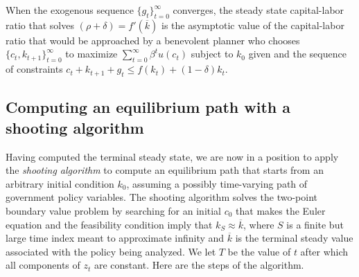 When the exogenous sequence  $\{g_t\}_{t=0}^\infty$  converges, the steady state capital-labor ratio that solves $(\rho+\delta)=f'(\overline k)$ is  the
asymptotic value of the capital-labor  ratio that would be approached by
a benevolent planner who chooses $\{c_t, k_{t+1}\}_{t=0}^\infty$ to maximize $\sum_{t=0}^\infty \beta^t u(c_t) $
subject to $k_0$ given and the sequence of constraints $c_t + k_{t+1} + g_t \leq f(k_t) + (1-\delta) k_t$.

\subsection{Computing an equilibrium path with a shooting algorithm}

Having computed the terminal steady state, we are now in a
position to apply the {\it shooting algorithm\/} to compute an
equilibrium path that starts from an arbitrary initial condition
$k_0$, assuming a possibly time-varying path of government policy variables.%
%
%
%
%
%
%
%
%
%
The shooting algorithm solves the two-point
boundary value problem by  searching for an initial $c_0$ that
makes the Euler equation  and the feasibility condition
 imply that $k_S \approx \overline k$, where $S$ is a
finite but large time index meant to approximate infinity and
$\overline k$ is the terminal steady value associated with the
policy being analyzed. We let $T$ be the value of $t$ after which
all components of $z_t$ are constant.
 Here are the steps of the algorithm.
